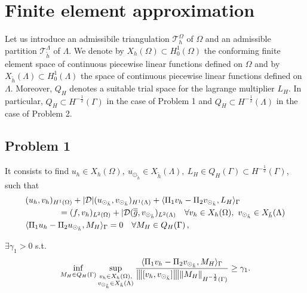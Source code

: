 \section{Finite element approximation}
Let us introduce an admissibile triangulation $\mathcal{T}^{\Omega}_h$ of $\Omega$ and an admissible partition $\mathcal{T}^{\Lambda}_{\tilde{h}}$ of $\Lambda$. We denote by $X_h(\Omega)\subset H^1_0(\Omega)$ the conforming finite element space of continuous piecewise linear functions defined on $\Omega$ and by $X_{\tilde{h}}(\Lambda)\subset H^1_0(\Lambda)$ the space of continuous piecewise linear functions defined on $\Lambda$. Moreover, $Q_H$ denotes a suitable trial space for the lagrange multiplier $L_H$. In particular, $Q_H \subset H^{-\frac12}(\Gamma )$ in the case of Problem 1 and $Q_H \subset H^{-\frac12}(\Lambda)$ in the case of Problem 2. 

\subsection{Problem 1}

\def\udh{u_{\odot_{\tilde{h}}}}
\def\vdh{v_{\odot_{\tilde{h}}}}

It consists to find $u_h \in X_h(\Omega) ,\ \udh \in X_{\tilde{h}}(\Lambda) , \ L_H \in Q_H(\Gamma) \subset H^{-\frac12}(\Gamma )$, such that
\begin{subequations}\label{eq:red_dirneu}
\begin{align}
&(u_h,v_h)_{H^1(\Omega)} + |{\cal D}| (\udh,\vdh)_{H^1(\Lambda)} 
+ \langle \Pi_1 v_h  - \Pi_2 \vdh, L_H \rangle_\Gamma 
\\
\nonumber
&\qquad\qquad= (f,v_h)_{L^2(\Omega)} + |{\cal D}(\avrd{g},\vdh)_{L^2(\Lambda)}
\quad \forall v_h \in X_h(\Omega), \ \vdh \in X_{\tilde{h}}(\Lambda)
\\
&   \langle \Pi_1 u_h - \Pi_2 \udh , M_H \rangle_\Gamma = 0
\quad \forall M_H \in Q_H(\Gamma)\,,
\end{align}
\end{subequations}

\begin{theorem}
$\exists \gamma _1 >0$ s.t.
\begin{equation}\label{inf_sup_discrete_prob1}
\inf_{M_H \in Q_H(\Gamma)} 
\sup_{\substack{v_h \in X_h(\Omega),\\ \vdh \in X_{\tilde{h}}(\Lambda)}} \frac{ \langle \Pi_1 v_h - \Pi_2 \vdh, M_H \rangle _{\Gamma}} {\vertiii{[v_h, \vdh]} \|M_H\|_{H^{-\frac 12 }(\Gamma)}} 
\geq \gamma _1. 
\end{equation}
\end{theorem}


